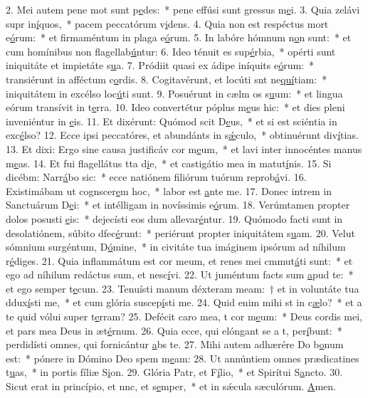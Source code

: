 2. Mei autem pene mot sunt p\uline{e}des:~* pene effúsi sunt gressus m\uline{e}i.
3. Quia zelávi supr in\uline{í}quos,~* pacem peccatórum v\uline{i}dens.
4. Quia non est respéctus mort e\uline{ó}rum:~* et firmaméntum in plaga e\uline{ó}rum.
5. In labóre hómnum n\uline{o}n sunt:~* et cum homínibus non flagellab\uline{ú}ntur:
6. Ideo ténuit es sup\uline{é}rbia,~* opérti sunt iniquitáte et impietáte s\uline{u}a.
7. Pródiit quasi ex ádipe iníquits e\uline{ó}rum:~* transiérunt in afféctum c\uline{o}rdis.
8. Cogitavérunt, et locúti snt ne\uline{quí}tiam:~* iniquitátem in excélso loc\uline{ú}ti sunt.
9. Posuérunt in cælm os s\uline{u}um:~* et lingua eórum transívit in t\uline{e}rra.
10. Ideo convertétur póplus m\uline{e}us hic:~* et dies pleni inveniéntur in \uline{e}is.
11. Et dixérunt: Quómod scit D\uline{e}us,~* et si est sciéntia in exc\uline{é}lso?
12. Ecce ipsi peccatóres, et abundánts in s\uline{ǽ}culo,~* obtinuérunt div\uline{í}tias.
13. Et dixi: Ergo sine causa justificáv cor m\uline{e}um,~* et lavi inter innocéntes manus m\uline{e}as.
14. Et fui flagellátus tta d\uline{i}e,~* et castigátio mea in matut\uline{í}nis.
15. Si dicébm: Narr\uline{á}bo sic:~* ecce natiónem filiórum tuórum reprob\uline{á}vi.
16. Existimábam ut cognscer\uline{e}m hoc,~* labor est \uline{a}nte me.
17. Donec intrem in Sanctuárum D\uline{e}i:~* et intélligam in novíssimis e\uline{ó}rum.
18. Verúmtamen propter dolos posusti \uline{e}is:~* dejecísti eos dum allevar\uline{é}ntur.
19. Quómodo facti sunt in desolatiónem, súbito dfec\uline{é}runt:~* periérunt propter iniquitátem s\uline{u}am.
20. Velut sómnium surgéntum, D\uline{ó}mine,~* in civitáte tua imáginem ipsórum ad níhilum r\uline{é}diges.
21. Quia inflammátum est cor meum, et renes mei cmmut\uline{á}ti sunt:~* et ego ad níhilum redáctus sum, et nesc\uline{í}vi.
22. Ut juméntum facts sum \uline{a}pud te:~* et ego semper t\uline{e}cum.
23. Tenuísti manum déxteram meam:~† et in voluntáte tua ddux\uline{í}sti me,~* et cum glória suscep\uline{í}sti me.
24. Quid enim mihi st in c\uline{æ}lo?~* et a te quid vólui super t\uline{e}rram?
25. Defécit caro mea, t cor m\uline{e}um:~* Deus cordis mei, et pars mea Deus in æt\uline{é}rnum.
26. Quia ecce, qui elóngant se a t, per\uline{í}bunt:~* perdidísti omnes, qui fornicántur \uline{a}bs te.
27. Mihi autem adhærére Do b\uline{o}num est:~* pónere in Dómino Deo spem m\uline{e}am:
28. Ut annúntiem omnes prædicatines t\uline{u}as,~* in portis fíliæ S\uline{i}on.
29. Glória Patr, et F\uline{í}lio,~* et Spirítui S\uline{a}ncto.
30. Sicut erat in princípio, et nnc, et s\uline{e}mper,~* et in sǽcula sæculórum. \uline{A}men.
